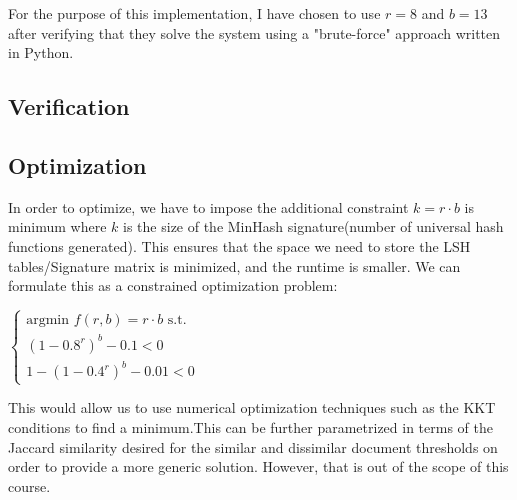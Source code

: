 For the purpose of this implementation, I have chosen to use $r=8$ and $b=13$ after verifying that they solve the system using a  "brute-force" approach written in Python.

\subsection{Verification}


\subsection{Optimization}
In order to optimize, we have to impose the additional constraint $k=r \cdot b$ is minimum where $k$ is the size of the MinHash signature(number of universal hash functions generated). This ensures that the space we need to store the LSH tables/Signature matrix is minimized, and the runtime is smaller. We can formulate this as a constrained optimization problem:

$\begin{cases}
\text{argmin } f(r,b) = r \cdot b \text{ s.t.}\\
(1-0.8^r)^b - 0.1< 0\\
1 - (1-0.4^r)^b - 0.01 < 0
\end{cases}$

This would allow us to use numerical optimization techniques such as the KKT conditions to find a minimum.This can be further parametrized in terms of the Jaccard similarity desired for the similar and dissimilar document thresholds on order to provide a more generic solution. However, that is out of the scope of this course.

